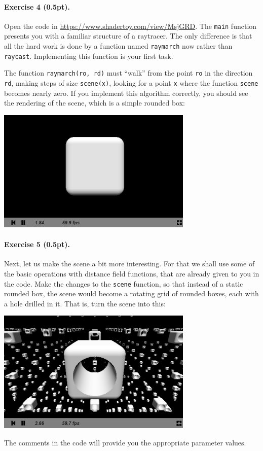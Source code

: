 \documentclass{article}
\newenvironment{exercise}[2]{\paragraph{Exercise #1 (#2pt).} }{
\medskip}
\begin{document}
\begin{exercise}{4}{0.5}
Open the code in \url{https://www.shadertoy.com/view/MsjGRD}. The \texttt{main} function presents you with a familiar structure of a raytracer. The only difference is that all the hard work is done by a function named \texttt{raymarch} now rather than \texttt{raycast}. Implementing this function is your first task. 

The function \texttt{raymarch(ro, rd)} must ``walk'' from the point \texttt{ro} in the direction \texttt{rd}, making steps of size \texttt{scene(x)}, looking for a point \texttt{x} where the function \texttt{scene} becomes nearly zero. If you implement this algorithm correctly, you should see the rendering of the scene, which is a simple rounded box:
\begin{center}
\includegraphics[width=0.7\textwidth]{raymarching1.png}
\end{center}
\end{exercise}


\begin{exercise}{5}{0.5}
Next, let us make the scene a bit more interesting. For that we shall use some of the basic operations with distance field functions, that are already given to you in the code. Make the changes to the \texttt{scene} function, so that instead of a static rounded box, the scene would become a rotating grid of rounded boxes, each with a hole drilled in it. That is, turn the scene into this:
\begin{center}
\includegraphics[width=0.7\textwidth]{raymarching2.png}
\end{center}
The comments in the code will provide you the appropriate parameter values.
\end{exercise}
\end{document}
